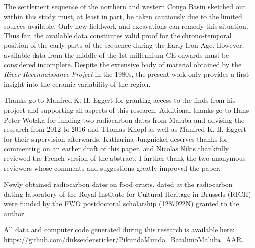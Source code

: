 \documentclass[smallextended,natbib]{svjour3}       %
\begin{document}
The settlement sequence of the northern and western Congo Basin sketched out within this study must, at least in part, be taken cautiously due to the limited sources available. Only new fieldwork and excavations can remedy this situation. Thus far, the available data constitutes valid proof for the chrono-temporal position of the early parts of the sequence during the Early Iron Age. However, available data from the middle of the 1st millennium CE onwards must be considered incomplete. Despite the extensive body of material obtained by the \textit{River Reconnaissance Project} in the 1980s, the present work only provides a first insight into the ceramic variability of the region.

\begin{acknowledgements}
Thanks go to Manfred K. H. Eggert for granting access to the finds from his project and supporting all aspects of this research. Additional thanks go to Hans-Peter Wotzka for funding two radiocarbon dates from Maluba and advising the research from 2012 to 2016 and Thomas Knopf as well as Manfred K. H. Eggert for their supervision afterwards. Katharina Jungnickel deserves thanks for commenting on an earlier draft of this paper, and Nicolas Nikis thankfully reviewed the French version of the abstract. I further thank the two anonymous reviewers whose comments and suggestions greatly improved the paper.

Newly obtained radiocarbon dates on food crusts, dated at the radiocarbon dating laboratory of the Royal Institute for Cultural Heritage in Brussels (RICH) were funded by the FWO postdoctoral scholarship (1287922N) granted to the author.

All data and computer code generated during this research is available here: \url{https://github.com/dirkseidensticker/PikundaMunda_BatalimoMaluba_AAR}.
\end{acknowledgements}



\end{document}
